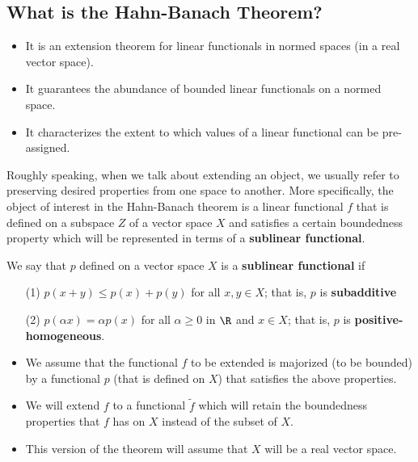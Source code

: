 \subsection{What is the Hahn-Banach Theorem?}

\begin{itemize}
    \item It is an extension theorem for linear functionals in normed spaces (in a real vector space).
    \item It guarantees the abundance of bounded linear functionals on a normed space. 
    \item It characterizes the extent to which values of a linear functional can be pre-assigned. 
\end{itemize}

Roughly speaking, when we talk about extending an object, we usually refer to preserving desired properties from one space to another. More specifically, the object of interest in the Hahn-Banach theorem is a linear functional \( f  \) that is defined on a subspace \( Z  \) of a vector space \( X  \) and satisfies a certain boundedness property which will be represented in terms of a \textbf{sublinear functional}. 

\begin{definition}
    We say that \( p  \) defined on a vector space \( X  \) is a \textbf{sublinear functional} if 
    \begin{enumerate}
        \item[(1)] \( p(x + y) \leq p(x) + p(y) \) for all \( x,y \in X  \); that is, \( p  \) is \textbf{subadditive} \\
        \item[(2)] \( p(\alpha x ) = \alpha p(x) \) for all \( \alpha \geq 0  \) in \( \R  \) and \( x \in X  \); that is, \( p  \) is \textbf{positive-homogeneous}.
    \end{enumerate}
\end{definition}

\begin{itemize}
    \item We assume that the functional \( f  \) to be extended is majorized (to be bounded) by a functional \( p  \) (that is defined on \( X  \)) that satisfies the above properties. 
    \item We will extend \( f  \) to a functional \( \tilde{f} \) which will retain the boundedness properties that \( f  \) has on \( X  \) instead of the subset of \( X  \). 
    \item This version of the theorem will assume that \( X  \) will be a real vector space.
\end{itemize}

